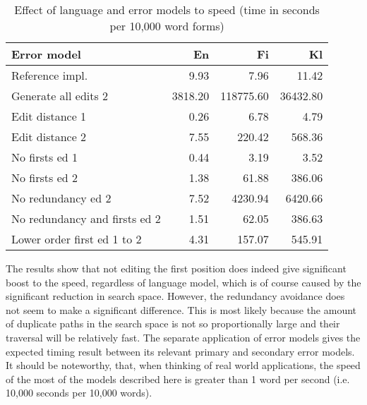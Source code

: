 \documentclass[free]{flammie}
\begin{document}
\begin{table}[h]
\begin{center}
\begin{scriptsize}
\begin{tabular}{|l|rrr|}
\hline
\bf Error model & \bf En & \bf Fi & \bf Kl \\ 
\hline
Reference impl. &
9.93&7.96&11.42
\\
Generate all edits 2 & 
3818.20&118775.60&36432.80
\\
\hline
Edit distance 1 &
0.26&6.78&4.79
\\
Edit distance 2 &
7.55&220.42&568.36
\\
No firsts ed 1 & 
0.44&3.19&3.52
\\
No firsts ed 2 &
1.38&61.88&386.06
\\
No redundancy ed 2 &
7.52&4230.94&6420.66
\\
No redundancy and firsts ed 2 &
1.51&62.05&386.63
\\
Lower order first ed 1 to 2 &
4.31&157.07&545.91
\\
\hline
\end{tabular}
\end{scriptsize}
\end{center}
\caption{\label{table:error-model-vs-language-speed} Effect of language and 
error models to speed (time in seconds per 10,000 word forms)}
\end{table}

The results show that not editing the first position does indeed give
significant boost to the speed, regardless of language model, which is of course
caused by the significant reduction in search space. However, the
redundancy avoidance does not seem to make a significant difference. This is most
likely because the amount of duplicate paths in the search space is not so
proportionally large and their traversal will be relatively fast. The separate
application of error models gives the expected timing result between its
relevant primary and secondary error models. It should be noteworthy, that, when
thinking of real world applications, the speed of the most of the models
described here is greater than 1 word per second (i.e. 10,000 seconds per 10,000
words).
\end{document}
